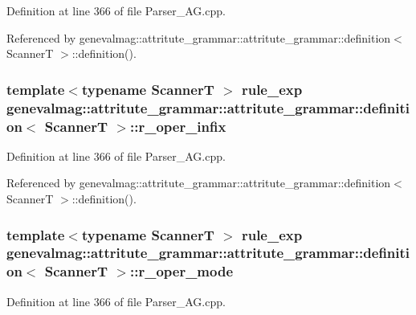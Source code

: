 Definition at line 366 of file Parser\_\-AG.cpp.

Referenced by genevalmag::attritute\_\-grammar::attritute\_\-grammar::definition$<$ ScannerT $>$::definition().\hypertarget{structgenevalmag_1_1attritute__grammar_1_1definition_05efc7cb225fb68e0334a7c09b877d13}{
\subsubsection[{r\_\-oper\_\-infix}]{\setlength{\rightskip}{0pt plus 5cm}template$<$typename ScannerT $>$ {\bf rule\_\-exp} genevalmag::attritute\_\-grammar::attritute\_\-grammar::definition$<$ ScannerT $>$::{\bf r\_\-oper\_\-infix}}}
\label{structgenevalmag_1_1attritute__grammar_1_1definition_05efc7cb225fb68e0334a7c09b877d13}




Definition at line 366 of file Parser\_\-AG.cpp.

Referenced by genevalmag::attritute\_\-grammar::attritute\_\-grammar::definition$<$ ScannerT $>$::definition().\hypertarget{structgenevalmag_1_1attritute__grammar_1_1definition_f8dc229f8842682dfcc76c4b8f72939f}{
\subsubsection[{r\_\-oper\_\-mode}]{\setlength{\rightskip}{0pt plus 5cm}template$<$typename ScannerT $>$ {\bf rule\_\-exp} genevalmag::attritute\_\-grammar::attritute\_\-grammar::definition$<$ ScannerT $>$::{\bf r\_\-oper\_\-mode}}}
\label{structgenevalmag_1_1attritute__grammar_1_1definition_f8dc229f8842682dfcc76c4b8f72939f}




Definition at line 366 of file Parser\_\-AG.cpp.

